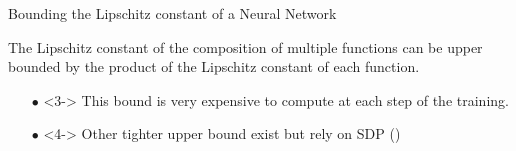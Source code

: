 \begin{frame}{Bounding the Lipschitz constant of a Neural Network}

  The Lipschitz constant of the composition of multiple functions can be upper bounded by the product of the Lipschitz constant of each function.


  \begin{itemize}
    \item[$\bullet$] <3-> This bound is very expensive to compute at each step of the training.
    \item[$\bullet$] <4-> Other tighter upper bound exist but rely on SDP ({})
  \end{itemize}

 
\end{frame}




